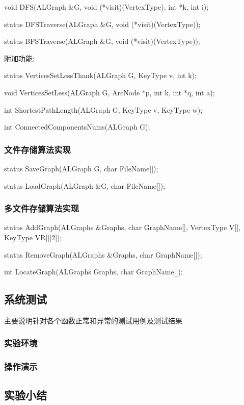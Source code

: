 \documentclass[supercite]{Experimental_Report}
\theoremstyle{definition}
\begin{document}
void DFS(ALGraph \&G, void (*visit)(VertexType), int *k, int i);

status DFSTraverse(ALGraph \&G, void (*visit)(VertexType));

status BFSTraverse(ALGraph \&G, void (*visit)(VertexType));

附加功能:

status VerticesSetLessThank(ALGraph G, KeyType v, int k);

void VerticesSetLess(ALGraph G, ArcNode *p, int k, int *q, int a);

int ShortestPathLength(ALGraph G, KeyType v, KeyType w);

int ConnectedComponentsNums(ALGraph G);

\subsubsection{文件存储算法实现}

status SaveGraph(ALGraph G, char FileName[]);

status LoadGraph(ALGraph \&G, char FileName[]);

\subsubsection{多文件存储算法实现}

status AddGraph(ALGraphs \&Graphs, char GraphName[], VertexType V[], KeyType VR[][2]);

status RemoveGraph(ALGraphs \&Graphs, char GraphName[]);

int LocateGraph(ALGraphs Graphs, char GraphName[]);

\subsection{系统测试}

主要说明针对各个函数正常和异常的测试用例及测试结果

\subsubsection{实验环境}

\subsubsection{操作演示}

\subsection{实验小结}
\end{document}
